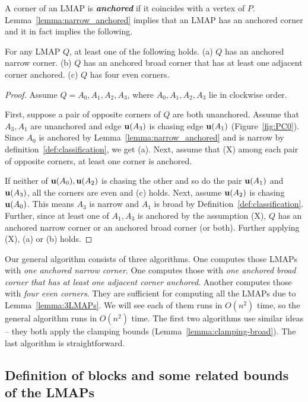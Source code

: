 \documentclass{ws-ijcga}
\begin{document}
A corner of an LMAP is \textbf{\emph{anchored}} if it coincides with a vertex of $P$.
Lemma~\ref{lemma:narrow_anchored} implies that an LMAP has an anchored corner and it in fact implies the following.

\begin{lemma}\label{lemma:3LMAPs}
For any LMAP $Q$, at least one of the following holds.
(a) $Q$ has an anchored narrow corner.
(b) $Q$ has an anchored broad corner that has at least one adjacent corner anchored.
(c) $Q$ has four even corners.
\end{lemma}

\begin{proof}
Assume $Q=A_0,A_1,A_2,A_3$, where $A_0,A_1,A_2,A_3$ lie in clockwise order.

First, suppose a pair of opposite corners of $Q$ are both unanchored.
Assume that $A_3,A_1$ are unanchored and edge $\mathbf{u}(A_3)$ is chasing edge $\mathbf{u}(A_1)$ (Figure~\ref{fig:PC0}).
Since $A_0$ is anchored by Lemma~\ref{lemma:narrow_anchored} and is narrow by definition~\ref{def:classification}, we get (a).
Next, assume that (X) among each pair of opposite corners, at least one corner is anchored.

If neither of $\mathbf{u}(A_0),\mathbf{u}(A_2)$ is chasing the other and so do the pair $\mathbf{u}(A_1)$ and $\mathbf{u}(A_3)$, all the corners are even and (c) holds.
Next, assume $\mathbf{u}(A_2)$ is chasing $\mathbf{u}(A_0)$.
This means $A_3$ is narrow and $A_1$ is broad by Definition~\ref{def:classification}.
Further, since at least one of $A_1,A_3$ is anchored by the assumption (X), $Q$ has an anchored narrow corner or an anchored broad corner (or both).
Further applying (X), (a) or (b) holds.
 \end{proof}

Our general algorithm consists of three algorithms.
One computes those LMAPs with \emph{one anchored narrow corner}.
One computes those with \emph{one anchored broad corner that has at least one adjacent corner anchored}.
Another computes those with \emph{four even corners}.
They are sufficient for computing all the LMAPs due to Lemma~\ref{lemma:3LMAPs}.
We will see each of them runs in $O(n^2)$ time, so the general algorithm runs in $O(n^2)$ time.
The first two algorithms use similar ideas -- they both apply the clamping bounds (Lemma~\ref{lemma:clamping-broad}).
The last algorithm is straightforward.

\subsection{Definition of blocks and some related bounds of the LMAPs}\label{subsect:blocks-transform}
\end{document}
